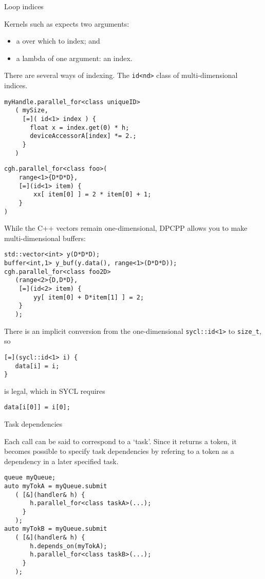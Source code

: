 {Loop indices}

Kernels such as 
expects two arguments:
\begin{itemize}
\item a  over which to index; and
\item a lambda of one argument: an index.
\end{itemize}

There are several ways of indexing.
The \lstinline+id<nd>+ class of multi-dimensional indices.
\begin{lstlisting}
myHandle.parallel_for<class uniqueID>
   ( mySize,
     [=]( id<1> index ) {
       float x = index.get(0) * h;
       deviceAccessorA[index] *= 2.;
     }
   )
\end{lstlisting}

\begin{lstlisting}
cgh.parallel_for<class foo>(
    range<1>{D*D*D},
    [=](id<1> item) {
        xx[ item[0] ] = 2 * item[0] + 1;
    }
)
\end{lstlisting}

While the C++ vectors remain one-dimensional,
\ac{DPCPP} allows you to make multi-dimensional buffers:
\begin{lstlisting}
std::vector<int> y(D*D*D);
buffer<int,1> y_buf(y.data(), range<1>(D*D*D));
cgh.parallel_for<class foo2D>
   (range<2>{D,D*D},
    [=](id<2> item) {
        yy[ item[0] + D*item[1] ] = 2;
    }
   );
\end{lstlisting}

\begin{dpcppnote}
  There is an implicit conversion from the one-dimensional
  \lstinline+sycl::id<1>+
  to \lstinline+size_t+, so
\begin{lstlisting}
[=](sycl::id<1> i) {
   data[i] = i;
}
\end{lstlisting}
is legal, which in SYCL requires
\begin{lstlisting}
data[i[0]] = i[0];
\end{lstlisting}
\end{dpcppnote}

 {Task dependencies}

Each  call can be said to correspond to a `task'.
Since it returns a token, it becomes possible to specify
task dependencies by refering to a token as a dependency
in a later specified task.
\begin{lstlisting}
queue myQueue;
auto myTokA = myQueue.submit
   ( [&](handler& h) {
       h.parallel_for<class taskA>(...);
     }
   );
auto myTokB = myQueue.submit
   ( [&](handler& h) {
       h.depends_on(myTokA);
       h.parallel_for<class taskB>(...);
     }
   );
\end{lstlisting}

